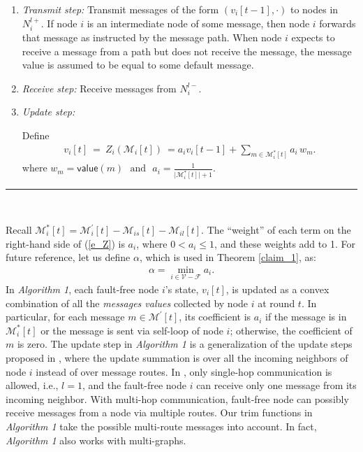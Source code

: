 \documentclass[letterpaper, 11pt]{article}
\newcommand{\calF}{{\mathcal{F}}}
\newcommand{\calM}{{\mathcal{M}}}
\newcommand{\calV}{{\mathcal{V}}}
\begin{document}
\begin{enumerate}
\label{algorithm}
\item {\em Transmit step:} Transmit messages of the form $(v_i[t-1], \cdot)$ to nodes in $N_i^{l+}$. If node $i$ is an intermediate node of some message, then node $i$ forwards that message as instructed by the message path.
    When node $i$ expects to receive a message from a path but does not receive the message, the message value is assumed to be equal to some default message.

\item {\em Receive step:} Receive messages from $N_i^{l-}$.


\item {\em Update step:}


Define
\begin{eqnarray}
v_i[t] ~ = ~ Z_i(\calM_{i}[t]) ~ = a_{i}v_i[t-1]+\sum_{m\in \calM_{i}^*[t]} a_{i} \, w_m.
\label{e_Z}
\end{eqnarray}
where $w_m=\mathsf{value}(m) ~~~\text{and}~~~  a_{i} = \frac{1}{\lvert \calM_{i}^*[t]\rvert+1}$.


\end{enumerate}
\hrule
\,

Recall $\calM_{i}^{*}[t]=\calM_i^{\prime}[t]-\calM_{is}[t]-\calM_{il}[t]$.
The ``weight'' of each term on the right-hand side of (\ref{e_Z}) is $a_i$, where $0<a_i\leq 1$, and these weights add to 1.
For future reference, let us define $\alpha$, which is used in Theorem \ref{claim_1}, as:
\begin{eqnarray}
\label{lowerbound}
\alpha=\min_{ i\in \calV-\calF} a_i.
\end{eqnarray}
In \emph {Algorithm 1}, each fault-free node $i$'s state, $v_i[t]$,  is updated as a convex combination of all the \emph{messages values} collected by node $i$ at round $t$. In particular, for each message $m\in \calM^{\prime}[t]$, its coefficient is $a_i$ if the message is in $\calM^*_i[t]$ or the message is sent via self-loop of node $i$; otherwise, the coefficient of $m$ is zero.
The update step in \emph {Algorithm 1} is a generalization of the update steps proposed in \cite{Vaidyamatrix,IBA_broadcast_Sundaram}, where the update summation is over all the incoming neighbors of node $i$ instead of over message routes. In \cite{Vaidyamatrix,IBA_broadcast_Sundaram}, only single-hop communication is allowed, i.e., $l=1$, and the fault-free node $i$ can receive only one message from its incoming neighbor. With multi-hop communication, fault-free node can possibly receive messages from a node via multiple routes. Our trim functions in \emph {Algorithm 1} take the possible multi-route messages into account. In fact, \emph {Algorithm 1} also works with multi-graphs.
\end{document}
